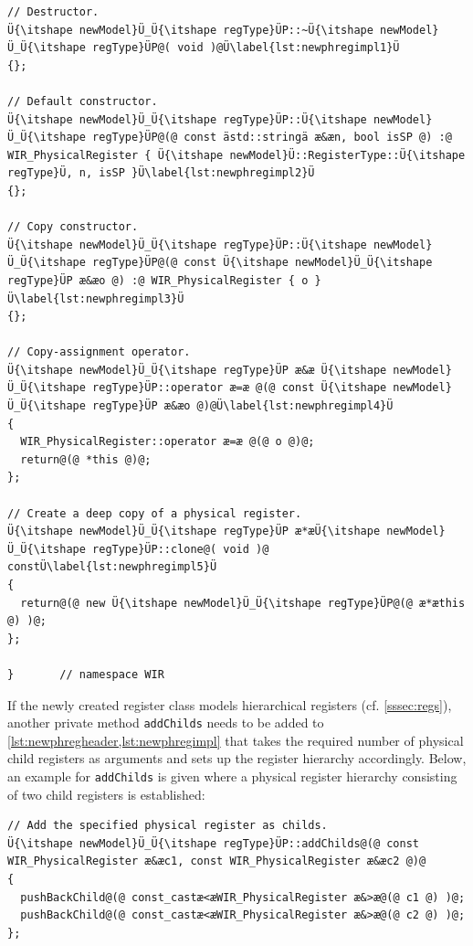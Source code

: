 \begin{enumerate}[resume]
\begin{lstlisting}[style=code,float=!t,caption={Implementation of a New Physical Register's Class},label=lst:newphregimpl]
// Destructor.
Ü{\itshape newModel}Ü_Ü{\itshape regType}ÜP::~Ü{\itshape newModel}Ü_Ü{\itshape regType}ÜP@( void )@Ü\label{lst:newphregimpl1}Ü
{};

// Default constructor.
Ü{\itshape newModel}Ü_Ü{\itshape regType}ÜP::Ü{\itshape newModel}Ü_Ü{\itshape regType}ÜP@(@ const ästd::stringä æ&æn, bool isSP @) :@ WIR_PhysicalRegister { Ü{\itshape newModel}Ü::RegisterType::Ü{\itshape regType}Ü, n, isSP }Ü\label{lst:newphregimpl2}Ü
{};

// Copy constructor.
Ü{\itshape newModel}Ü_Ü{\itshape regType}ÜP::Ü{\itshape newModel}Ü_Ü{\itshape regType}ÜP@(@ const Ü{\itshape newModel}Ü_Ü{\itshape regType}ÜP æ&æo @) :@ WIR_PhysicalRegister { o }Ü\label{lst:newphregimpl3}Ü
{};

// Copy-assignment operator.
Ü{\itshape newModel}Ü_Ü{\itshape regType}ÜP æ&æ Ü{\itshape newModel}Ü_Ü{\itshape regType}ÜP::operator æ=æ @(@ const Ü{\itshape newModel}Ü_Ü{\itshape regType}ÜP æ&æo @)@Ü\label{lst:newphregimpl4}Ü
{
  WIR_PhysicalRegister::operator æ=æ @(@ o @)@;
  return@(@ *this @)@;
};

// Create a deep copy of a physical register.
Ü{\itshape newModel}Ü_Ü{\itshape regType}ÜP æ*æÜ{\itshape newModel}Ü_Ü{\itshape regType}ÜP::clone@( void )@ constÜ\label{lst:newphregimpl5}Ü
{
  return@(@ new Ü{\itshape newModel}Ü_Ü{\itshape regType}ÜP@(@ æ*æthis @) )@;
};

}       // namespace WIR
\end{lstlisting}

  If the newly created register class models hierarchical registers (cf. \cref{sssec:regs}), another private method \texttt{addChilds} needs to be added to \cref{lst:newphregheader,lst:newphregimpl} that takes the required number of physical child registers as arguments and sets up the register hierarchy accordingly.
  Below, an example for \texttt{addChilds} is given where a physical register hierarchy consisting of two child registers is established: \label{enum:hierphreg}
\begin{lstlisting}[style=code,float=!h,xleftmargin=10mm,belowskip=-0.8 \baselineskip]
// Add the specified physical register as childs.
Ü{\itshape newModel}Ü_Ü{\itshape regType}ÜP::addChilds@(@ const WIR_PhysicalRegister æ&æc1, const WIR_PhysicalRegister æ&æc2 @)@
{
  pushBackChild@(@ const_castæ<æWIR_PhysicalRegister æ&>æ@(@ c1 @) )@;
  pushBackChild@(@ const_castæ<æWIR_PhysicalRegister æ&>æ@(@ c2 @) )@;
};
\end{lstlisting}


\end{enumerate}
